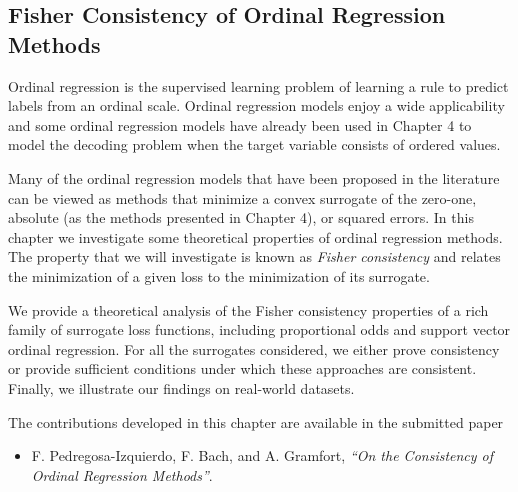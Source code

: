 \begin{fullwidth}
\chapter{Fisher Consistency of Ordinal Regression \mbox{Methods}}\label{chap:consistency}
\end{fullwidth}


\vspace*{\fill}

Ordinal regression is the supervised learning problem of learning a rule to predict labels from an ordinal scale. Ordinal regression models enjoy a wide applicability and some ordinal regression models have already been  used in Chapter 4 to model the decoding problem when the target variable consists of ordered values.


Many of the ordinal regression models that have been proposed in the literature can be viewed as methods that minimize a convex surrogate of the zero-one, absolute (as the methods presented in Chapter 4), or squared errors. In this chapter we investigate some theoretical properties of ordinal regression methods. The property that we will investigate is known as \emph{Fisher consistency} and relates the minimization of a given loss to the minimization of its surrogate. 


We provide a theoretical analysis of the Fisher consistency properties of a rich family of surrogate loss functions, including proportional odds and support vector ordinal regression. For all the surrogates considered, we either prove consistency or provide sufficient conditions under which these approaches are consistent. Finally, we illustrate our findings on real-world datasets.

\begin{shaded}
The contributions developed in this chapter are available in the submitted paper
\begin{itemize}
\item F. Pedregosa-Izquierdo, F. Bach, and A. Gramfort, \emph{``On the Consistency of Ordinal Regression Methods''}.
\end{itemize}
\end{shaded}

\vspace*{\fill}



\newpage 
\vspace*{\fill}
\minitoc
\vspace*{\fill}
\newpage


